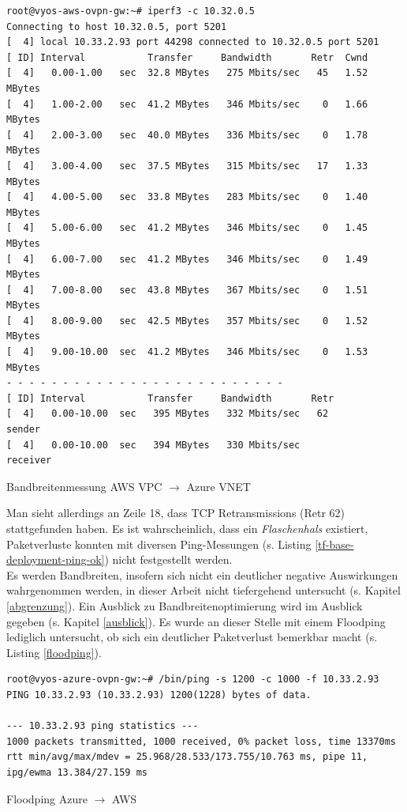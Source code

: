 \begin{listing}[h]
\begin{verbatim}
root@vyos-aws-ovpn-gw:~# iperf3 -c 10.32.0.5
Connecting to host 10.32.0.5, port 5201
[  4] local 10.33.2.93 port 44298 connected to 10.32.0.5 port 5201
[ ID] Interval           Transfer     Bandwidth       Retr  Cwnd
[  4]   0.00-1.00   sec  32.8 MBytes   275 Mbits/sec   45   1.52 MBytes
[  4]   1.00-2.00   sec  41.2 MBytes   346 Mbits/sec    0   1.66 MBytes
[  4]   2.00-3.00   sec  40.0 MBytes   336 Mbits/sec    0   1.78 MBytes
[  4]   3.00-4.00   sec  37.5 MBytes   315 Mbits/sec   17   1.33 MBytes
[  4]   4.00-5.00   sec  33.8 MBytes   283 Mbits/sec    0   1.40 MBytes
[  4]   5.00-6.00   sec  41.2 MBytes   346 Mbits/sec    0   1.45 MBytes
[  4]   6.00-7.00   sec  41.2 MBytes   346 Mbits/sec    0   1.49 MBytes
[  4]   7.00-8.00   sec  43.8 MBytes   367 Mbits/sec    0   1.51 MBytes
[  4]   8.00-9.00   sec  42.5 MBytes   357 Mbits/sec    0   1.52 MBytes
[  4]   9.00-10.00  sec  41.2 MBytes   346 Mbits/sec    0   1.53 MBytes
- - - - - - - - - - - - - - - - - - - - - - - - -
[ ID] Interval           Transfer     Bandwidth       Retr
[  4]   0.00-10.00  sec   395 MBytes   332 Mbits/sec   62             sender
[  4]   0.00-10.00  sec   394 MBytes   330 Mbits/sec                  receiver
\end{verbatim}
\caption{Bandbreitenmessung AWS VPC $\rightarrow$ Azure VNET}
\label{iperf3-vpc-vnet}
\end{listing}\FloatBarrier
Man sieht allerdings an Zeile 18, dass \gls{TCP} Retransmissions (\glqq Retr 62\grqq{}) stattgefunden haben. Es ist wahrscheinlich, dass ein \textit{Flaschenhals} existiert, Paketverluste konnten mit diversen Ping-Messungen (s. Listing \ref{tf-base-deployment-ping-ok}) nicht festgestellt werden.\\
Es werden Bandbreiten, insofern sich nicht ein deutlicher negative Auswirkungen wahrgenommen werden, in dieser Arbeit nicht tiefergehend untersucht (s. Kapitel \ref{abgrenzung}). Ein Ausblick zu Bandbreitenoptimierung wird im Ausblick gegeben (s. Kapitel \ref{ausblick}). Es wurde an dieser Stelle mit einem Floodping lediglich untersucht, ob sich ein deutlicher Paketverlust bemerkbar macht (s. Listing \ref{floodping}).
\begin{listing}[h]
\begin{verbatim}
root@vyos-azure-ovpn-gw:~# /bin/ping -s 1200 -c 1000 -f 10.33.2.93
PING 10.33.2.93 (10.33.2.93) 1200(1228) bytes of data.

--- 10.33.2.93 ping statistics ---
1000 packets transmitted, 1000 received, 0% packet loss, time 13370ms
rtt min/avg/max/mdev = 25.968/28.533/173.755/10.763 ms, pipe 11, ipg/ewma 13.384/27.159 ms
\end{verbatim}
\caption{Floodping Azure $\rightarrow$ AWS}
\label{floodping}
\end{listing}\FloatBarrier

